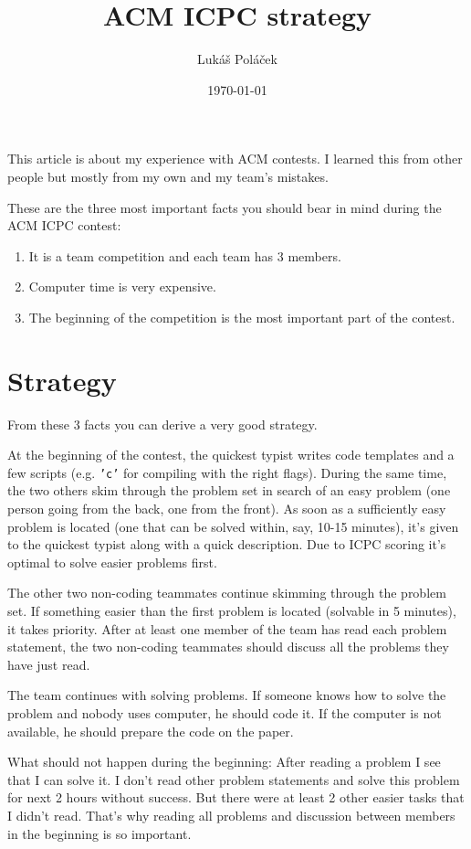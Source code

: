\documentclass{article}
\author{Lukáš Poláček}
\title{ACM ICPC strategy}
\date{\today}
\begin{document}
\maketitle
This article is about my experience with ACM contests. I learned this from other
people but mostly from my own and my team's mistakes.

These are the three most important facts you should bear in mind during the ACM ICPC
contest:
\begin{enumerate}
\item It is a team competition and each team has 3 members.
\item Computer time is very expensive.
\item The beginning of the competition is the most important part of the contest.
\end{enumerate}

\section{Strategy}
From these 3 facts you can derive a very good strategy.

At the beginning of the contest, the quickest typist writes code templates and a
few scripts (e.g. {\tt 'c'} for compiling with the right flags). During the same
time, the two others skim through the problem set in search of an easy problem
(one person going from the back, one from the front).  As soon as a sufficiently
easy problem is located (one that can be solved within, say, 10-15 minutes),
it's given to the quickest typist along with a quick description. Due to ICPC
scoring it's optimal to solve easier problems first.

The other two non-coding teammates continue skimming through the problem set.
If something easier than the first problem is located (solvable in 5 minutes),
it takes priority. After at least one member of the team has read each problem
statement, the two non-coding teammates should discuss all the problems they
have just read.

The team continues with solving problems. If someone knows how to solve the
problem and nobody uses computer, he should code it. If the computer is not
available, he should prepare the code on the paper.

What should not happen during the beginning: After reading a problem I see that
I can solve it. I don't read other problem statements and solve this problem for
next 2 hours without success. But there were at least 2 other easier tasks that
I didn't read. That's why reading all problems and discussion between members in
the beginning is so important.
\end{document}
